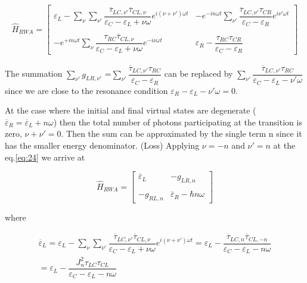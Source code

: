 \begin{multline} \label{eq:24}
\widehat{H}_{RWA}= \begin{bmatrix}
\varepsilon_L - \sum_{\nu} \sum_{\nu'} {\dfrac { \overline{\tau}_{LC,\nu'} \overline{\tau}_{CL,\nu} } {\varepsilon_C - \varepsilon_L + \nu \omega} e^{ i (\nu+\nu')\omega t } }
& -e^{ - i n \omega t }\sum_{\nu'} { \dfrac{  \overline{\tau}_{LC,\nu'} {\tau}_{CR} } {\varepsilon_C - \varepsilon_R} e^{ i \nu'\omega t }}
\\
\\
-e^{ + i n \omega t }\sum_{\nu}{\dfrac{ {\tau}_{RC} \overline{\tau}_{CL,\nu}  } {\varepsilon_C - \varepsilon_L + \nu \omega } e^{ -i \nu\omega t }} 
& \varepsilon_R - \dfrac{\tau_{RC} \tau_{CR} }{ \varepsilon_C - \varepsilon_ R }
\end{bmatrix} 
\end{multline}

The summation $ \sum_{\nu'} {g_{LR,\nu'}}$ =$ \sum_{\nu'} { \dfrac { \overline{ \tau}_{LC,\nu'} \tau_{RC} }{ \varepsilon_C-\varepsilon_R}}$ can be replaced by $ \sum_{\nu'} { \dfrac{\overline{\tau}_{LC,\nu'}\tau_{RC}} {\varepsilon_C-\varepsilon_L -\nu'\omega} }$ since we are close to the resonance condition $\varepsilon_R-\varepsilon_L -\nu'\omega=0$.


At the case where the initial and final virtual states are degenerate ( $\overline{\varepsilon}_{R}=\overline{\varepsilon}_{L}+ n \omega $) then the total number of photons participating at the transition is zero, $\nu+\nu'=0$. Then the sum can be approximated by the single term n since it has the smaller energy denominator. (Loss) Applying  $\nu=-n$ and  $\nu'=n$ at the eq.\ref{eq:24} we arrive at

\begin{equation}  \label{eq:25}
\widehat{H}_{RWA}=\begin{bmatrix}
\overline{\varepsilon}_{L}
& {-g_{LR,n} }
 \\ 
 \\
{-g_{RL,n} } 
& \overline{\varepsilon}_{R}-\hbar n \omega
\end{bmatrix} 
\end{equation}


where 

\begin{multline*}
\overline{\varepsilon}_L = \varepsilon_L - \sum_{\nu} \sum_{\nu'}  \dfrac  {\overline{\tau}_{LC,\nu'} \overline{\tau}_{CL,\nu}}  {\varepsilon_C - \varepsilon_L + \nu \omega} e^{ i (\nu+\nu')\omega t} 
= \varepsilon_L- \dfrac  {\overline{\tau}_{LC,n} \overline{\tau}_{CL,-n}}  {\varepsilon_C - \varepsilon_L - n \omega} 
\\=  \varepsilon_L - \dfrac{J_{n}^2 \tau_{LC} \tau_{CL}}{\varepsilon_C - \varepsilon_L - n \omega}
\end{multline*}

